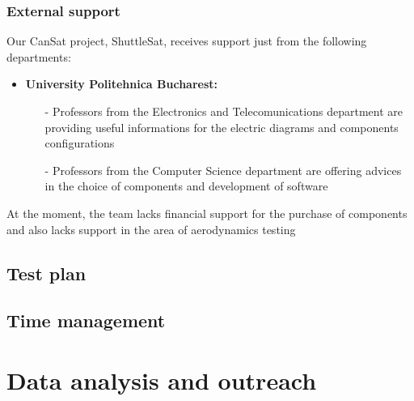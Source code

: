 \documentclass[11pt]{article}
\begin{document}
\subsubsection{External support}
Our CanSat project, ShuttleSat, receives support just from the following departments:
\begin{itemize}
\item \textbf{University Politehnica Bucharest:} 
\begin{itemize}
\item[-] Professors from the Electronics and Telecomunications department are providing useful informations for the electric diagrams and components configurations
\item[-] Professors from the Computer Science department are offering advices in the choice of components and development of software
\end{itemize}
\end{itemize}

At the moment, the team lacks financial support for the purchase of components and also lacks support in the area of aerodynamics testing

\subsection{Test plan}

\subsection{Time management}




\section{Data analysis and outreach}
\end{document}
